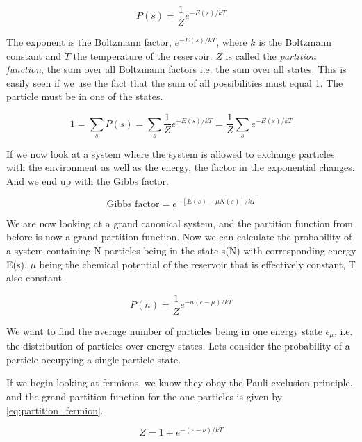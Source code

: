 \begin{equation} \label{eq:prob_boltzmann}
P(s) =  \frac{1}{Z} e^{-E(s)/kT}    
\end{equation}

The exponent is the Boltzmann factor, $e^{-E(s)/kT}$, where $k$ is the Boltzmann constant and $T$ the temperature of the reservoir. $Z$ is called the \textit{partition function}, the sum over all Boltzmann factors i.e. the sum over all states. This is easily seen if we use the fact that the sum of all possibilities must equal 1. The particle must be in one of the states. 


\begin{equation}
1 = \sum_s P(s) = \sum_s \frac{1}{Z} e^{-E(s)/kT} = \frac{1}{Z} \sum_s e^{-E(s)/kT}
\end{equation}

If we now look at a system where the system is allowed to exchange particles with the environment as well as the energy, the factor in the exponential changes. And we end up with the Gibbs factor. 

\begin{equation}
\text{Gibbs factor} = e^{-[E(s) - \mu N(s)]/kT}
\end{equation}

We are now looking at a grand canonical system, and the partition function from before is now a grand partition function.
Now we can calculate the probability of a system containing N particles being in the state s(N) with corresponding energy E(s).
$\mu$ being the chemical potential of the reservoir that is effectively constant, T also constant.

\begin{equation}
P(n) = \frac{1}{Z} e^{-n(\epsilon - \mu)/kT}
\end{equation}

We want to find the average number of particles being in one energy state $\epsilon_{\mu}$, i.e. the distribution of particles over energy states. Lets consider the probability of a particle occupying a single-particle state. 

If we begin looking at fermions, we know they obey the Pauli exclusion principle, and the grand partition function for the one particles is given by \eqref{eq:partition_fermion}.

\begin{equation} \label{eq:partition_fermion}
Z = 1 + e^{-(\epsilon - \nu)/kT}
\end{equation}

